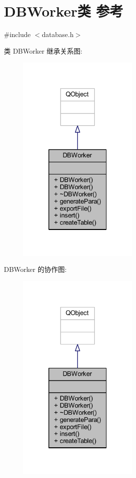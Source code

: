 \hypertarget{class_d_b_worker}{}\section{D\+B\+Worker类 参考}
\label{class_d_b_worker}


{\ttfamily \#include $<$database.\+h$>$}



类 D\+B\+Worker 继承关系图\+:
\nopagebreak
\begin{figure}[H]
\begin{center}
\leavevmode
\includegraphics[width=169pt]{class_d_b_worker__inherit__graph}
\end{center}
\end{figure}


D\+B\+Worker 的协作图\+:
\nopagebreak
\begin{figure}[H]
\begin{center}
\leavevmode
\includegraphics[width=169pt]{class_d_b_worker__coll__graph}
\end{center}
\end{figure}
